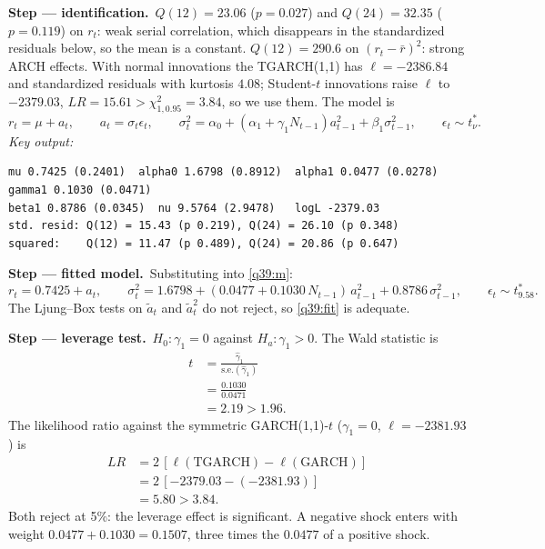 \documentclass[11pt,a4paper]{article}
\newcommand{\passo}[2]{\par\smallskip\noindent\textbf{Step --- #1.}~#2}
\begin{document}
\begin{sol}
\passo{identification}{$Q(12)=23.06$ ($p=0.027$) and $Q(24)=32.35$ ($p=0.119$) on $r_t$: weak serial
correlation, which disappears in the standardized residuals below, so the mean is a constant. $Q(12)=290.6$ on
$(r_t-\bar r)^2$: strong ARCH effects. With normal innovations the TGARCH(1,1) has $\ell=-2386.84$ and
standardized residuals with kurtosis $4.08$; Student-$t$ innovations raise $\ell$ to $-2379.03$,
$LR=15.61>\chi^2_{1,0.95}=3.84$, so we use them. The model is}
\begin{equation}\label{q39:m} r_t=\mu+a_t,\qquad a_t=\sigma_t\epsilon_t,\qquad \sigma_t^2=\alpha_0+(\alpha_1+\gamma_1N_{t-1})a_{t-1}^2+\beta_1\sigma_{t-1}^2,\qquad \epsilon_t\sim t^*_\nu . \end{equation}
\noindent\textit{Key output:}
\begingroup\footnotesize
\begin{verbatim}
mu 0.7425 (0.2401)  alpha0 1.6798 (0.8912)  alpha1 0.0477 (0.0278)  gamma1 0.1030 (0.0471)
beta1 0.8786 (0.0345)  nu 9.5764 (2.9478)   logL -2379.03
std. resid: Q(12) = 15.43 (p 0.219), Q(24) = 26.10 (p 0.348)
squared:    Q(12) = 11.47 (p 0.489), Q(24) = 20.86 (p 0.647)
\end{verbatim}
\endgroup
\passo{fitted model}{Substituting into \eqref{q39:m}:}
\begin{equation}\label{q39:fit} r_t=0.7425+a_t,\qquad \sigma_t^2=1.6798+(0.0477+0.1030\,N_{t-1})\,a_{t-1}^2+0.8786\,\sigma_{t-1}^2,\qquad \epsilon_t\sim t^*_{9.58}. \end{equation}
The Ljung--Box tests on $\tilde a_t$ and $\tilde a_t^2$ do not reject, so \eqref{q39:fit} is adequate.
\passo{leverage test}{$H_0\!:\gamma_1=0$ against $H_a\!:\gamma_1>0$. The Wald statistic is}
\begin{align*}
t &= \frac{\hat\gamma_1}{\text{s.e.}(\hat\gamma_1)}\\
&= \frac{0.1030}{0.0471}\\
&= 2.19 > 1.96 .
\end{align*}
The likelihood ratio against the symmetric GARCH(1,1)-$t$ ($\gamma_1=0$, $\ell=-2381.93$) is
\begin{align*}
LR &= 2\,[\ell(\text{TGARCH})-\ell(\text{GARCH})]\\
&= 2\,[-2379.03-(-2381.93)]\\
&= 5.80>3.84 .
\end{align*}
Both reject at 5\%: the leverage effect is significant. A negative shock enters with weight
$0.0477+0.1030=0.1507$, three times the $0.0477$ of a positive shock.


\end{sol}
\end{document}
